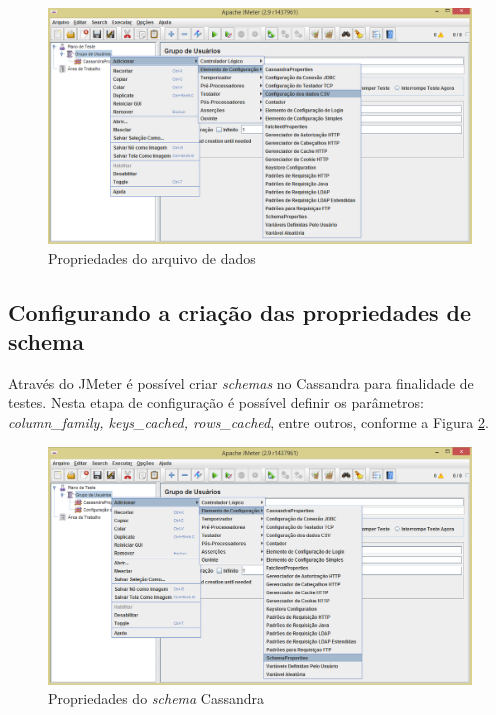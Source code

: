    \begin{figure}[htb]
    \centering
    \includegraphics[scale=0.5]{imagens/csvprop.png}
    \caption{Propriedades do arquivo de dados}
    \label{fig:csvprop}
    \end{figure}

\subsection{Configurando a criação das propriedades de schema}

Através do JMeter é possível criar \textit{schemas} no Cassandra para finalidade de testes. Nesta etapa de configuração é possível definir os parâmetros: \textit{column\_family, keys\_cached, rows\_cached}, entre outros, conforme a Figura \ref{fig:schemaprop}.

   \begin{figure}[htb]
    \centering
    \includegraphics[scale=0.5]{imagens/schemaprop.png}
    \caption{Propriedades do \textit{schema} Cassandra}
    \label{fig:schemaprop}
    \end{figure}

